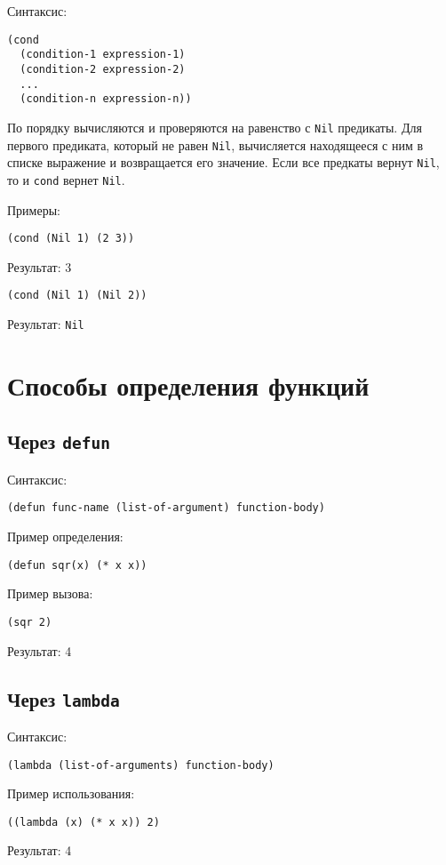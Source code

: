 Синтаксис:
\begin{lstlisting}
(cond 
  (condition-1 expression-1)
  (condition-2 expression-2)
  ...
  (condition-n expression-n))
\end{lstlisting}

По порядку вычисляются и проверяются на равенство с \texttt{Nil} предикаты. Для первого предиката, который не равен \texttt{Nil}, вычисляется находящееся с ним в списке выражение и возвращается его значение. Если все предкаты вернут \texttt{Nil}, то и \texttt{cond} вернет \texttt{Nil}.

Примеры:

\begin{lstlisting}
(cond (Nil 1) (2 3))
\end{lstlisting}
Результат: 3

\begin{lstlisting}
(cond (Nil 1) (Nil 2))
\end{lstlisting}
Результат: \texttt{Nil}

\section{Способы определения функций}

\subsection{Через \texttt{defun}}

Синтаксис:
\begin{lstlisting}
(defun func-name (list-of-argument) function-body)
\end{lstlisting}

Пример определения:
\begin{lstlisting}
(defun sqr(x) (* x x))
\end{lstlisting}

Пример вызова:
\begin{lstlisting}
(sqr 2)
\end{lstlisting}
Результат: 4

\subsection{Через \texttt{lambda}}

Синтаксис:
\begin{lstlisting}
(lambda (list-of-arguments) function-body)
\end{lstlisting}

Пример использования:
\begin{lstlisting}
((lambda (x) (* x x)) 2)
\end{lstlisting}
Результат: 4
